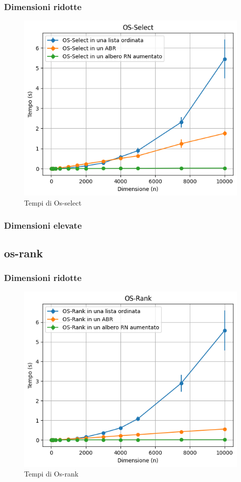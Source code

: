 \documentclass[onecolumn]{article}
\begin{document}
\subsubsection{Dimensioni ridotte}
\begin{figure}[H]
	\centering
	\includegraphics[width=\linewidth-5em]{os-select.png}
	\caption{Tempi di Os-select}
	\label{fig:os-select}
\end{figure}
\subsubsection{Dimensioni elevate}

\subsection{os-rank}
\subsubsection{Dimensioni ridotte}

\begin{figure}[H]
    \centering
	\includegraphics[width=\linewidth]{os-rank.png}
	\caption{Tempi di Os-rank}
	\label{fig:os-rank}
\end{figure}
\end{document}
